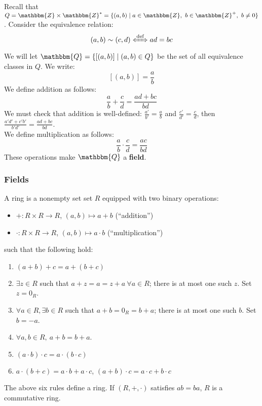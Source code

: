 \documentclass[10pt]{extarticle}
\newcommand{\Q}{\mathbbm{Q}}
\newcommand{\Z}{\mathbbm{Z}}
\begin{document}
    Recall that $Q = \Z \times \Z^* = \{(a,b) \mid a\in \Z,~b\in \Z^{+},~b\neq 0\}$. Consider the equivalence relation:
      \[
        (a,b)\sim(c,d) \xLeftrightarrow{\text{def}} ad = bc
      \] 
      We will let $\Q = \{[(a,b)]\mid (a,b) \in Q\}$ be the set of all equivalence classes in $Q$. We write:
      \[
        [(a,b)] = \frac{a}{b}
      \] 
      We define addition as follows:
      \[
        \frac{a}{b} + \frac{c}{d} = \frac{ad + bc}{bd}
      \] 
      We must check that addition is well-defined: $\frac{a'}{b'} = \frac{a}{b}$ and $\frac{c'}{d'} = \frac{c}{d}$, then $\frac{a'd' + c'b'}{b'd'} = \frac{ad+bc}{bd}$.\\

      We define multiplication as follows:
      \[
        \frac{a}{b} \cdot \frac{c}{d} = \frac{ac}{bd}
      \] 
      These operations make $\Q$ a \textbf{field}.
      \subsubsection{Fields}%
        A ring is a nonempty set set $R$ equipped with two binary operations:
        \begin{itemize}
          \item $+: R\times R \rightarrow R$, $(a,b) \mapsto a+b$ (``addition'')
          \item $\cdot: R\times R \rightarrow R$, $(a,b) \mapsto a\cdot b$ (``multiplication'')
        \end{itemize}
        such that the following hold:
        \begin{enumerate}[(1)]
          \item $(a+b)+c = a+(b+c)$
          \item $\exists z\in R$ such that $a+z = a = z+a~\forall a\in R$; there is at most one such $z$. Set $z = 0_R$.
          \item $\forall a\in R,\exists b\in R$ such that $a+b = 0_R = b+a$; there is at most one such $b$. Set $b = -a$.
          \item $\forall a,b\in R,~a+b = b+a$.
          \item $(a\cdot b)\cdot c = a\cdot(b\cdot c)$
          \item $a\cdot(b+c) = a\cdot b + a\cdot c$, $(a+b)\cdot c = a\cdot c + b\cdot c$
        \end{enumerate}
        The above six rules define a ring. If $(R,+,\cdot)$ satisfies $ab = ba$, $R$ is a commutative ring.\\
\end{document}
